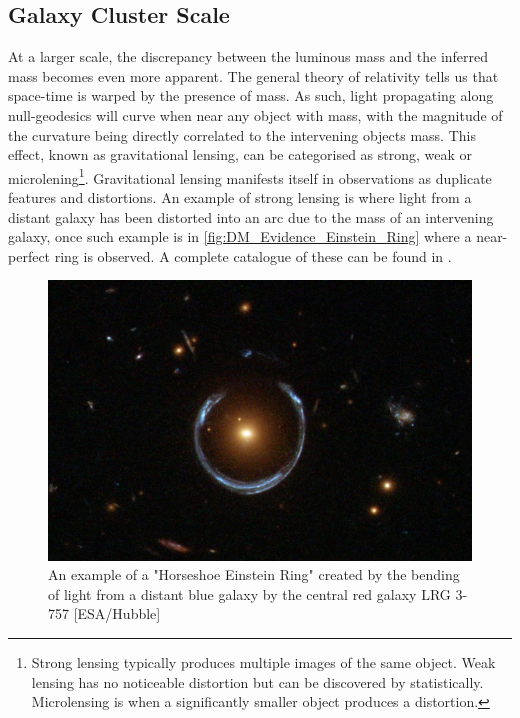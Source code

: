 \subsection{Galaxy Cluster Scale}
\par
At a larger scale, the discrepancy between the luminous mass and the inferred mass becomes even more apparent.
The general theory of relativity tells us that space-time is warped by the presence of mass.
As such, light propagating along null-geodesics will curve when near any object with mass, with the magnitude of the curvature being directly correlated to the intervening objects mass.
This effect, known as gravitational lensing, can be categorised as strong, weak or microlening\footnote{Strong lensing typically produces multiple images of the same object. Weak lensing has no noticeable distortion but can be discovered by statistically. Microlensing is when a significantly smaller object produces a distortion.}. 
Gravitational lensing manifests itself in observations as duplicate features and distortions.
An example of strong lensing is where light from a distant galaxy has been distorted into an arc due to the mass of an intervening galaxy, once such example is in \autoref{fig:DM_Evidence_Einstein_Ring}  where a near-perfect ring is observed.
A complete catalogue of these can be found in \cite{einstein_ring_discovery_ref}.

\begin{figure}%
    \centering
    \includegraphics[scale=0.4]{Figures/DarkMatterEvidence/Einstein_Ring_from_Hubble.JPG}
    \caption{An example of a "Horseshoe Einstein Ring" created by the bending of light from a distant blue galaxy by the central red galaxy LRG 3-757 [ESA/Hubble]}
    \label{fig:DM_Evidence_Einstein_Ring}
\end{figure}

